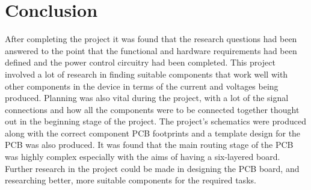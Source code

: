 
\chapter{Conclusion} %

\label{Chapter8} %

	After completing the project it was found that the research questions had been answered to the point that the functional and hardware requirements had been defined and the power control circuitry had been completed. This project involved a lot of research in finding suitable components that work well with other components in the device in terms of the current and voltages being produced. Planning was also vital during the project, with a lot of the signal connections and how all the components were to be connected together thought out in the beginning stage of the project. The project's schematics were produced along with the correct component PCB footprints and a template design for the PCB was also produced. It was found that the main routing stage of the PCB was highly complex especially with the aims of having a six-layered board. \\
	Further research in the project could be made in designing the PCB board, and researching better, more suitable components for the required tasks. 






